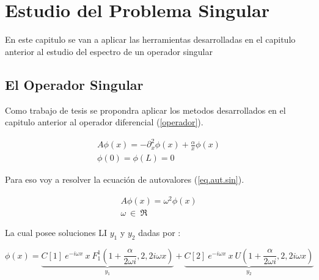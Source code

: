 \chapter{Estudio del Problema Singular}

En este capitulo se van a aplicar las herramientas desarrolladas en el capitulo anterior al estudio del espectro de un operador singular

\section{El Operador Singular}

Como trabajo de tesis se propondra aplicar los metodos desarrollados en el capitulo anterior al operador diferencial (\ref{operador}).

\begin{equation}
\begin{array}{c}
    A \phi (x) = - \partial ^2 _x  \phi(x) + \frac{\alpha}{x} \phi(x) \\
    \phi(0) = \phi(L) = 0 
\end{array}
\label{operador}
\end{equation}

Para eso voy a resolver la ecuación de autovalores (\ref{eq.aut.sin}).

\begin{equation}
\begin{array}{c}
    A  \phi (x)  =   \omega ^2 \phi (x) \\ 
    \omega \ \in \ \mathfrak{R}
\end{array}
\label{eq.aut.sin}
\end{equation}

La cual posee soluciones LI $ y_1 $ y $ y_2 $ dadas por :

\begin{equation}
    \phi (x) = 
    \underbrace{
    C[1] \ e ^{-i \omega x} \ x \ F _{1} ^{1} (1+\frac{ \alpha}{2 \omega i },2,2 i \omega x) } _ {y_1}
    + \underbrace{C[2] \ e^{-i \omega x } \ x \ U (1+\frac{ \alpha}{2 \omega i },2,2 i \omega x) } _{y_2} 
\end{equation}




